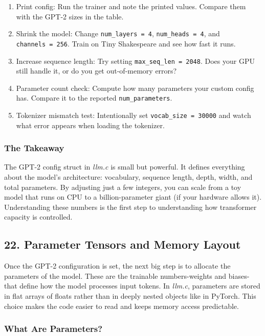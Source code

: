 \documentclass[
  letterpaper,
  DIV=11,
  numbers=noendperiod]{scrreprt}
\providecommand{\tightlist}{%
  \setlength{\itemsep}{0pt}\setlength{\parskip}{0pt}}
\begin{document}
\begin{enumerate}
\def\labelenumi{\arabic{enumi}.}
\tightlist
\item
  Print config: Run the trainer and note the printed values. Compare
  them with the GPT-2 sizes in the table.
\item
  Shrink the model: Change \texttt{num\_layers\ =\ 4},
  \texttt{num\_heads\ =\ 4}, and \texttt{channels\ =\ 256}. Train on
  Tiny Shakespeare and see how fast it runs.
\item
  Increase sequence length: Try setting \texttt{max\_seq\_len\ =\ 2048}.
  Does your GPU still handle it, or do you get out-of-memory errors?
\item
  Parameter count check: Compute how many parameters your custom config
  has. Compare it to the reported \texttt{num\_parameters}.
\item
  Tokenizer mismatch test: Intentionally set
  \texttt{vocab\_size\ =\ 30000} and watch what error appears when
  loading the tokenizer.
\end{enumerate}

\subsubsection{The Takeaway}\label{the-takeaway-10}

The GPT-2 config struct in \emph{llm.c} is small but powerful. It
defines everything about the model's architecture: vocabulary, sequence
length, depth, width, and total parameters. By adjusting just a few
integers, you can scale from a toy model that runs on CPU to a
billion-parameter giant (if your hardware allows it). Understanding
these numbers is the first step to understanding how transformer
capacity is controlled.

\subsection{22. Parameter Tensors and Memory
Layout}\label{parameter-tensors-and-memory-layout}

Once the GPT-2 configuration is set, the next big step is to allocate
the parameters of the model. These are the trainable numbers-weights and
biases-that define how the model processes input tokens. In
\emph{llm.c}, parameters are stored in flat arrays of floats rather than
in deeply nested objects like in PyTorch. This choice makes the code
easier to read and keeps memory access predictable.

\subsubsection{What Are Parameters?}\label{what-are-parameters}
\end{document}

